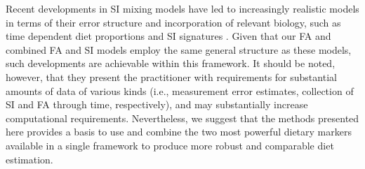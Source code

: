 \documentclass{article}%
\begin{document}
\begin{spacing}{1.9}
\begin{flushleft}
Recent developments in SI mixing models have led to increasingly
realistic models in terms of their error structure \citep{hopkins_estimating_2012} and
incorporation of relevant biology, such as time dependent diet
proportions and SI signatures \citep{parnell_bayesian_2012}. Given that our FA and combined
FA and SI models employ the same general structure as these models,
such developments are achievable within this framework. It should be
noted, however, that they present the practitioner with requirements for substantial
amounts of data of various kinds (i.e., measurement error estimates,
collection of SI and FA through time, respectively), and may
substantially increase computational requirements. Nevertheless, we
suggest that the methods presented here provides a basis to use and
combine the two most powerful dietary markers available in
a single framework to produce more robust and comparable diet estimation.

\printbibliography%
\end{flushleft}
\end{spacing}
\end{document}
